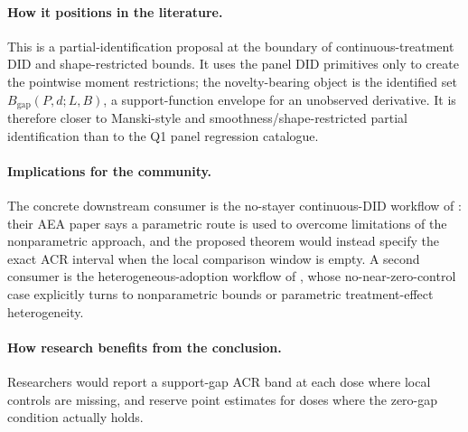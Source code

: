 \documentclass[11pt]{article}
\theoremstyle{definition}
\theoremstyle{plain}
\theoremstyle{remark}
\begin{document}
\paragraph{How it positions in the literature.}
This is a partial-identification proposal at the boundary of continuous-treatment DID and shape-restricted bounds.  It uses the panel DID primitives only to create the pointwise moment restrictions; the novelty-bearing object is the identified set \(B_{\mathrm{gap}}(P,d;L,B)\), a support-function envelope for an unobserved derivative.  It is therefore closer to Manski-style and smoothness/shape-restricted partial identification than to the Q1 panel regression catalogue.

\paragraph{Implications for the community.}
The concrete downstream consumer is the no-stayer continuous-DID workflow of \citet{deChaisemartinDHaultfoeuilleVazquezBare2024}: their AEA paper says a parametric route is used to overcome limitations of the nonparametric approach, and the proposed theorem would instead specify the exact ACR interval when the local comparison window is empty.  A second consumer is the heterogeneous-adoption workflow of \citet{deChaisemartinCicciaDHaultfoeuilleKnau2024}, whose no-near-zero-control case explicitly turns to nonparametric bounds or parametric treatment-effect heterogeneity.

\paragraph{How research benefits from the conclusion.}
Researchers would report a support-gap ACR band at each dose where local controls are missing, and reserve point estimates for doses where the zero-gap condition actually holds.
\end{document}
